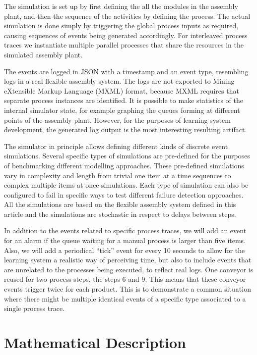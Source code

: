 \documentclass[procedia]{easychair}
\begin{document}
The simulation is set up by first defining the all the modules in the assembly plant, and then the sequence of the activities by defining the process. The actual simulation
is done simply by triggering the global process inputs as required, causing sequences of events being generated accordingly. For interleaved process traces we instantiate multiple
parallel processes that share the resources in the simulated assembly plant.

The events are logged in JSON with a timestamp and an event type, resembling logs in a real flexible assembly system. The logs are not exported to
Mining eXtensible Markup Language (MXML) format, because MXML requires that separate process instances are identified. It is possible to make statistics of the internal simulator
state, for example graphing the queues forming at different points of the assembly plant. However, for the purposes of learning system development, the generated log output is the most
interesting resulting artifact.

The simulator in principle allows defining different kinds of discrete event simulations. Several specific types of simulations are pre-defined for the purposes of benchmarking
different modelling approaches. These pre-defined simulations vary in complexity and length from trivial one item at a time sequences to complex multiple items at once simulations.
Each type of simulation can also be configured to fail in specific ways to test different failure detection approaches. All the simulations are based on the flexible assembly system
defined in this article and the simulations are stochastic in respect to delays between steps.

In addition to the events related to specific process traces, we will add an event for an alarm if the queue waiting for a manual process is larger than five items. Also, we will
add a periodical ``tick'' event for every 10 seconds to allow for the learning system a realistic way of perceiving time, but also to include events that are unrelated to
the processes being executed, to reflect real logs. One conveyor is reused for two process steps, the steps 6 and 9. This means that these conveyor events
trigger twice for each product. This is to demonstrate a common situation where there might be multiple identical events of a specific type
associated to a single process trace.

\section{Mathematical Description}
\end{document}
